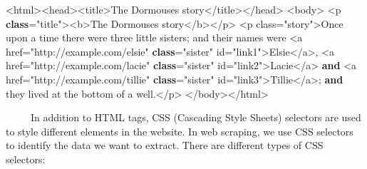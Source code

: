 \documentclass[
  letterpaper,
  DIV=11,
  numbers=noendperiod]{scrreprt}
\newenvironment{Shaded}{\begin{snugshade}}{\end{snugshade}}
\newcommand{\BuiltInTok}[1]{\textcolor[rgb]{0.00,0.23,0.31}{#1}}
\newcommand{\ErrorTok}[1]{\textcolor[rgb]{0.68,0.00,0.00}{#1}}
\newcommand{\KeywordTok}[1]{\textcolor[rgb]{0.00,0.23,0.31}{\textbf{#1}}}
\newcommand{\NormalTok}[1]{\textcolor[rgb]{0.00,0.23,0.31}{#1}}
\newcommand{\OperatorTok}[1]{\textcolor[rgb]{0.37,0.37,0.37}{#1}}
\newcommand{\StringTok}[1]{\textcolor[rgb]{0.13,0.47,0.30}{#1}}
\begin{document}
\begin{Shaded}
\begin{Highlighting}[]
\OperatorTok{\textless{}}\NormalTok{html}\OperatorTok{\textgreater{}\textless{}}\NormalTok{head}\OperatorTok{\textgreater{}\textless{}}\NormalTok{title}\OperatorTok{\textgreater{}}\NormalTok{The Dormouse}\StringTok{\textquotesingle{}s story\textless{}/title\textgreater{}\textless{}/head\textgreater{}}
\ErrorTok{\textless{}body\textgreater{}}
\OperatorTok{\textless{}}\NormalTok{p }\KeywordTok{class}\OperatorTok{=}\StringTok{"title"}\OperatorTok{\textgreater{}\textless{}}\NormalTok{b}\OperatorTok{\textgreater{}}\NormalTok{The Dormouse}\StringTok{\textquotesingle{}s story\textless{}/b\textgreater{}\textless{}/p\textgreater{}}
\ErrorTok{\textless{}p class="story"\textgreater{}Once upon a time there were three little sisters; and their names were}
\OperatorTok{\textless{}}\NormalTok{a href}\OperatorTok{=}\StringTok{"http://example.com/elsie"} \KeywordTok{class}\OperatorTok{=}\StringTok{"sister"} \BuiltInTok{id}\OperatorTok{=}\StringTok{"link1"}\OperatorTok{\textgreater{}}\NormalTok{Elsie}\OperatorTok{\textless{}/}\NormalTok{a}\OperatorTok{\textgreater{}}\NormalTok{,}
\OperatorTok{\textless{}}\NormalTok{a href}\OperatorTok{=}\StringTok{"http://example.com/lacie"} \KeywordTok{class}\OperatorTok{=}\StringTok{"sister"} \BuiltInTok{id}\OperatorTok{=}\StringTok{"link2"}\OperatorTok{\textgreater{}}\NormalTok{Lacie}\OperatorTok{\textless{}/}\NormalTok{a}\OperatorTok{\textgreater{}} \KeywordTok{and}
\OperatorTok{\textless{}}\NormalTok{a href}\OperatorTok{=}\StringTok{"http://example.com/tillie"} \KeywordTok{class}\OperatorTok{=}\StringTok{"sister"} \BuiltInTok{id}\OperatorTok{=}\StringTok{"link3"}\OperatorTok{\textgreater{}}\NormalTok{Tillie}\OperatorTok{\textless{}/}\NormalTok{a}\OperatorTok{\textgreater{};}
\KeywordTok{and}\NormalTok{ they lived at the bottom of a well.}\OperatorTok{\textless{}/}\NormalTok{p}\OperatorTok{\textgreater{}}
\OperatorTok{\textless{}/}\NormalTok{body}\OperatorTok{\textgreater{}\textless{}/}\NormalTok{html}\OperatorTok{\textgreater{}}
\end{Highlighting}
\end{Shaded}

~~~~~In addition to HTML tags, CSS (Cascading Style Sheets) selectors
are used to style different elements in the website. In web scraping, we
use CSS selectors to identify the data we want to extract. There are
different types of CSS selectors:
\end{document}

